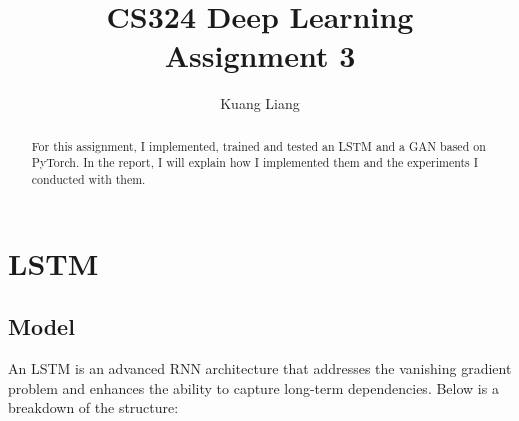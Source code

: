 \documentclass[12pt]{article}
\begin{document}
 
 
\title{CS324 Deep Learning\\ \textbf{Assignment 3}}
\author{Kuang Liang}

\maketitle

\begin{abstract}

For this assignment, I implemented, trained and tested an LSTM and a GAN based on PyTorch. In the report, I will explain how I implemented them and the
experiments I conducted with them.

\end{abstract}

\section{LSTM}

\subsection{Model}

An LSTM is an advanced RNN architecture that addresses the vanishing gradient problem and enhances the ability to capture long-term dependencies. Below is a breakdown of the structure:
\end{document}
